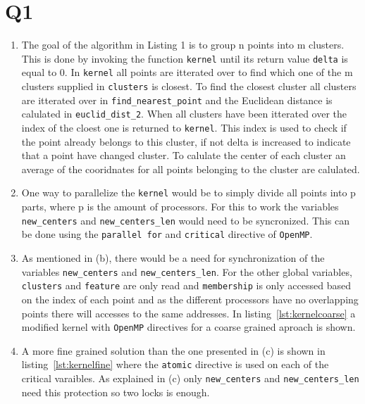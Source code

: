 \documentclass[a4paper]{article}
\begin{document}
\section*{Q1}
\begin{enumerate}
\item %
The goal of the algorithm in Listing 1 is to group n points into m clusters. This is done by invoking the function \texttt{kernel} until its return value \texttt{delta} is equal to 0. In \texttt{kernel} all points are itterated over to find which one of the m clusters supplied in \texttt{clusters} is closest. To find the closest cluster all clusters are itterated over in \texttt{find\_nearest\_point} and the Euclidean distance is calulated in \texttt{euclid\_dist\_2}. When all clusters have been itterated over the index of the cloest one is returned to \texttt{kernel}. This index is used to check if the point already belongs to this cluster, if not delta is increased to indicate that a point have changed cluster. To calulate the center of each cluster an average of the cooridnates for all points belonging to the cluster are calulated. 

\item %
\label{itm:b}
One way to parallelize the \texttt{kernel} would be to simply divide all points into p parts, where p is the amount of processors. For this to work the variables \texttt{new\_centers} and \texttt{new\_centers\_len} would need to be syncronized. This can be done using the \texttt{parallel for} and \texttt{critical} directive of \texttt{OpenMP}. 

\item %
\label{itm:c}
As mentioned in (b), there would be a need for synchronization of the variables \texttt{new\_centers} and \texttt{new\_centers\_len}. For the other global variables, \texttt{clusters} and \texttt{feature} are only read and \texttt{membership} is only accessed based on the index of each point and as the different processors have no overlapping points there will accesses to the same addresses. In listing~\ref{lst:kernelcoarse} a modified kernel with \texttt{OpenMP} directives for a coarse grained aproach is shown.

\item %
A more fine grained solution than the one presented in (c) is shown in listing~\ref{lst:kernelfine} where the \texttt{atomic} directive is used on each of the critical varaibles. As explained in (c) only \texttt{new\_centers} and \texttt{new\_centers\_len} need this protection so two locks is enough.


\end{enumerate}
\lstset{language=C,frame=single}


\end{document}
